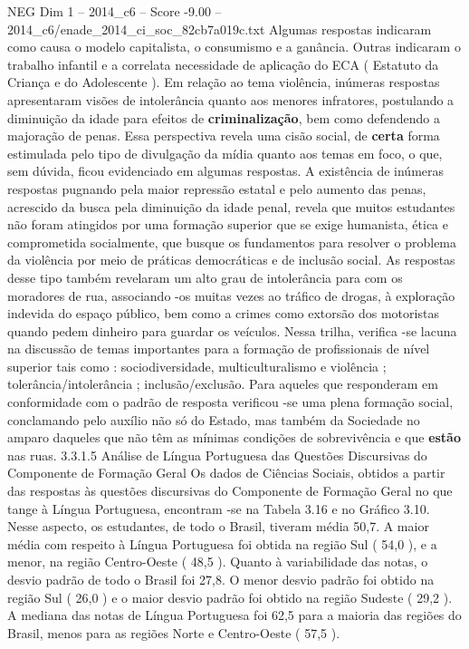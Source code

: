 \begin{textsample}{NEG Dim 1 – 2014\_c6 – Score -9.00 – 2014\_c6/enade\_2014\_ci\_soc\_82cb7a019c.txt}
Algumas respostas indicaram como causa o modelo capitalista, o consumismo e a ganância.
Outras indicaram o trabalho infantil e a correlata necessidade de aplicação do ECA ( Estatuto da Criança e do Adolescente ).
Em relação ao tema violência, inúmeras respostas apresentaram visões de intolerância quanto aos menores infratores, postulando a diminuição da idade para efeitos de \textbf{criminalização}, bem como defendendo a majoração de penas.
Essa perspectiva revela uma cisão social, de \textbf{certa} forma estimulada pelo tipo de divulgação da mídia quanto aos temas em foco, o que, sem dúvida, ficou evidenciado em algumas respostas.
A existência de inúmeras respostas pugnando pela maior repressão estatal e pelo aumento das penas, acrescido da busca pela diminuição da idade penal, revela que muitos estudantes não foram atingidos por uma formação superior que se exige humanista, ética e comprometida socialmente, que busque os fundamentos para resolver o problema da violência por meio de práticas democráticas e de inclusão social.
As respostas desse tipo também revelaram um alto grau de intolerância para com os moradores de rua, associando -os muitas vezes ao tráfico de drogas, à exploração indevida do espaço público, bem como a crimes como extorsão dos motoristas quando pedem dinheiro para guardar os veículos.
Nessa trilha, verifica -se lacuna na discussão de temas importantes para a formação de profissionais de nível superior tais como : sociodiversidade, multiculturalismo e violência ; tolerância/intolerância ; inclusão/exclusão.
Para aqueles que responderam em conformidade com o padrão de resposta verificou -se uma plena formação social, conclamando pelo auxílio não só do Estado, mas também da Sociedade no amparo daqueles que não têm as mínimas condições de sobrevivência e que \textbf{estão} nas ruas. 3.3.1.5 Análise de Língua Portuguesa das Questões Discursivas do Componente de Formação Geral Os dados de Ciências Sociais, obtidos a partir das respostas às questões discursivas do Componente de Formação Geral no que tange à Língua Portuguesa, encontram -se na Tabela 3.16 e no Gráfico 3.10.
Nesse aspecto, os estudantes, de todo o Brasil, tiveram média 50,7.
A maior média com respeito à Língua Portuguesa foi obtida na região Sul ( 54,0 ), e a menor, na região Centro-Oeste ( 48,5 ).
Quanto à variabilidade das notas, o desvio padrão de todo o Brasil foi 27,8.
O menor desvio padrão foi obtido na região Sul ( 26,0 ) e o maior desvio padrão foi obtido na região Sudeste ( 29,2 ).
A mediana das notas de Língua Portuguesa foi 62,5 para a maioria das regiões do Brasil, menos para as regiões Norte e Centro-Oeste ( 57,5 ).

\end{textsample}

